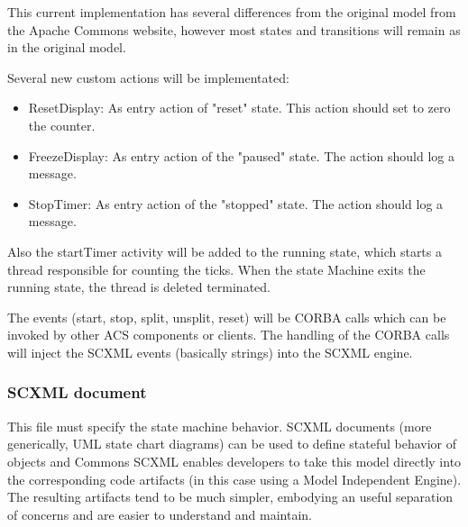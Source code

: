 \documentclass[]{article}
\begin{document}
This current implementation has several differences from the original model from the Apache Commons website\cite{Apache}, however most states and transitions will remain as in the original model.

Several new custom actions will be implementated: 

\begin{itemize}
   \item \textsf{ResetDisplay:} As entry action of "reset" state. This action should set to zero the counter. 
   \item \textsf{FreezeDisplay:} As entry action of the "paused" state. The action should log a message.
   \item \textsf{StopTimer:} As entry action of the "stopped" state. The action should log a message. 
\end{itemize}

Also the startTimer activity will be added to the \textsf{running} state, which starts a thread responsible for counting the ticks. When the state Machine exits the \textsf{running} state, the thread is deleted terminated. 

The events (\textsf{start}, \textsf{stop}, \textsf{split}, \textsf{unsplit}, \textsf{reset}) will be CORBA calls which can be invoked by other ACS components or clients. The handling of the CORBA calls will inject the SCXML events (basically strings) into the SCXML engine. 

\subsubsection{SCXML document}

This file must specify the state machine behavior. SCXML documents (more generically, UML state chart diagrams) can be used to define stateful behavior of objects and Commons SCXML enables developers to take this model directly into the corresponding code artifacts (in this case using a Model Independent Engine). The resulting artifacts tend to be much simpler, embodying an useful separation of concerns and are easier to understand and maintain.

\lstset{
language=Java,
basicstyle=\footnotesize,
breaklines=true,
numberstyle=\footnotesize,
frame=single
}
\end{document}
